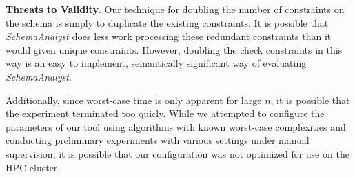 

\textbf{Threats to Validity}. Our technique for doubling the number of constraints on the schema is simply to duplicate
the existing constraints. It is possible that \textit{SchemaAnalyst} does less work processing these redundant
constraints than it would given unique constraints. However, doubling the check constraints in this way is an easy to
implement, semantically significant way of evaluating \textit{SchemaAnalyst}.

Additionally, since worst-case time is only apparent for large $n$, it is possible that the experiment terminated too
quicly.  While we attempted to configure the parameters of our tool using algorithms with known worst-case complexities
and conducting preliminary experiments with various settings under manual supervision, it is possible that our
configuration was not optimized for use on the HPC cluster.

